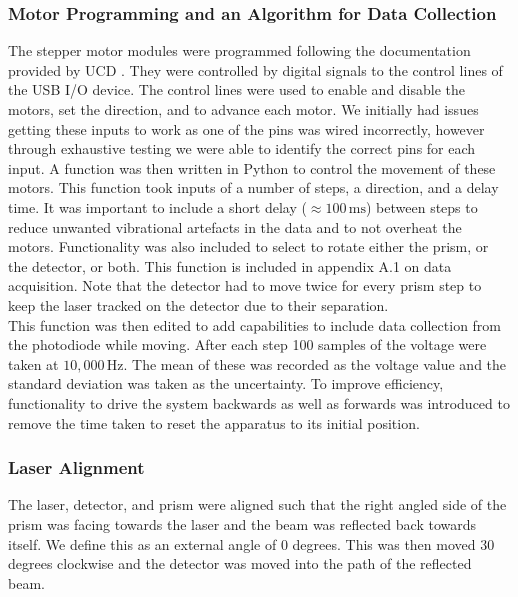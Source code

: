 \documentclass[%
reprint,
amsmath,amssymb,
aps,
]{revtex4-2}
\begin{document}
			\subsubsection{Motor Programming and an Algorithm for Data Collection}
				The stepper motor modules were programmed following the documentation provided by UCD \cite{motorDoc}. They were controlled by digital signals to the control lines of the USB I/O device. The control lines were used to enable and disable the motors, set the direction, and to advance each motor. We initially had issues getting these inputs to work as one of the pins was wired incorrectly, however through exhaustive testing we were able to identify the correct pins for each input. A function was then written in Python to control the movement of these motors. This function took inputs of a number of steps, a direction, and a delay time. It was important to include a short delay ($\approx 100\,\text{ms}$) between steps to reduce unwanted vibrational artefacts in the data and to not overheat the motors. Functionality was also included to select to rotate either the prism, or the detector, or both. This function is included in appendix A.1 on data acquisition. Note that the detector had to move twice for every prism step to keep the laser tracked on the detector due to their separation.\\
			
				This function was then edited to add capabilities to include data collection from the photodiode while moving. After each step 100 samples of the voltage were taken at $10,000\,\text{Hz}$. The mean of these was recorded as the voltage value and the standard deviation was taken as the uncertainty. To improve efficiency, functionality to drive the system backwards as well as forwards was introduced to remove the time taken to reset the apparatus to its initial position.\\

			\subsubsection{Laser Alignment}
				The laser, detector, and prism were aligned such that the right angled side of the prism was facing towards the laser and the beam was reflected back towards itself. We define this as an external angle of $0$ degrees. This was then moved $30$ degrees clockwise and the detector was moved into the path of the reflected beam.
			
\end{document}
